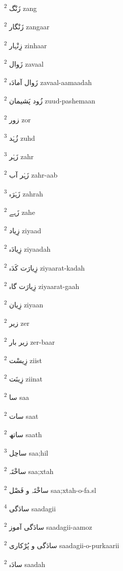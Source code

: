 \documentclass[12pt]{article}
\begin{document}
\begin{multicols}{5}
{\ur زَنْگ}   \textsuperscript{2} zang

{\ur زَنْگار}   \textsuperscript{2} zangaar

{\ur زِنْہار}   \textsuperscript{2} zinhaar

{\ur زَوال}   \textsuperscript{2} zavaal

{\ur زَوال آمادَہ}   \textsuperscript{2} zavaal-aamaadah

{\ur زُود پَشیمان}   \textsuperscript{2} zuud-pashemaan

{\ur زور}   \textsuperscript{2} zor

{\ur زُہْد}   \textsuperscript{3} zuhd

{\ur زَہْر}   \textsuperscript{3} zahr

{\ur زَہْر آب}   \textsuperscript{2} zahr-aab

{\ur زَہْرَہ}   \textsuperscript{3} zahrah

{\ur زَہے}   \textsuperscript{2} zahe

{\ur زِیاد}   \textsuperscript{2} ziyaad

{\ur زِیادَہ}   \textsuperscript{2} ziyaadah

{\ur زِیارَت کَدَہ}   \textsuperscript{2} ziyaarat-kadah

{\ur زِیارَت گاہ}   \textsuperscript{2} ziyaarat-gaah

{\ur زِیان}   \textsuperscript{2} ziyaan

{\ur زیر}   \textsuperscript{2} zer

{\ur زیر بار}   \textsuperscript{2} zer-baar

{\ur زِیسْت}   \textsuperscript{2} ziist

{\ur زِینَت}   \textsuperscript{2} ziinat

{\ur سا}   \textsuperscript{2} saa

{\ur سات}   \textsuperscript{2} saat

{\ur ساتھ}   \textsuperscript{2} saath

{\ur ساحِل}   \textsuperscript{3} saa;hil

{\ur ساخْتَہ}   \textsuperscript{2} saa;xtah

{\ur ساخْتَہ و فَصْل}   \textsuperscript{2} saa;xtah-o-fa.sl

{\ur سادَگی}   \textsuperscript{4} saadagii

{\ur سادَگی آموز}   \textsuperscript{2} saadagii-aamoz

{\ur سادَگی و پُرْکاری}   \textsuperscript{2} saadagii-o-purkaarii

{\ur سادَہ}   \textsuperscript{2} saadah


\end{multicols}
\end{document}
